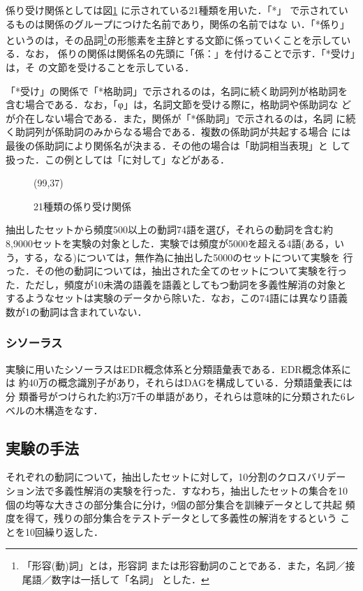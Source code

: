 \newpage
係り受け関係としては図\ref{fig:rels} に示されている21種類を用いた．「*」
で示されているものは関係のグループにつけた名前であり，関係の名前ではな
い．「*係り」というのは，その品詞\footnote{「形容(動)詞」とは，形容詞
または形容動詞のことである．また，名詞／接尾語／数字は一括して「名詞」
とした．}の形態素を主辞とする文節に係っていくことを示している．なお，
係りの関係は関係名の先頭に「係：」を付けることで示す．「*受け」は，そ
の文節を受けることを示している．

「*受け」の関係で「*格助詞」で示されるのは，名詞に続く助詞列が格助詞を
含む場合である．なお，「φ」は，名詞文節を受ける際に，格助詞や係助詞な
どが介在しない場合である．また，関係が「*係助詞」で示されるのは，名詞
に続く助詞列が係助詞のみからなる場合である．複数の係助詞が共起する場合
には最後の係助詞により関係名が決まる．その他の場合は「助詞相当表現」と
して扱った．この例としては「に対して」などがある．

\begin{figure}[htbp]
  \begin{center}
    \leavevmode
    \atari(99,37)
  \end{center}
  \caption{21種類の係り受け関係}
  \label{fig:rels}
\end{figure}

抽出したセットから頻度500以上の動詞74語を選び，それらの動詞を含む約
8,9000セットを実験の対象とした．実験では頻度が5000を超える4語(ある，い
う，する，なる)については，無作為に抽出した5000のセットについて実験を
行った．その他の動詞については，抽出された全てのセットについて実験を行っ
た．ただし，頻度が10未満の語義を語義としてもつ動詞を多義性解消の対象と
するようなセットは実験のデータから除いた．なお，この74語には異なり語義
数が1の動詞は含まれていない．

\subsubsection{シソーラス}

実験に用いたシソーラスはEDR概念体系と分類語彙表である．EDR概念体系には
約40万の概念識別子があり，それらはDAGを構成している．分類語彙表には分
類番号がつけられた約3万7千の単語があり，それらは意味的に分類された6レ
ベルの木構造をなす．

\subsection{実験の手法}
\label{sec:method}

それぞれの動詞について，抽出したセットに対して，10分割のクロスバリデー
ション法で多義性解消の実験を行った．すなわち，抽出したセットの集合を10
個の均等な大きさの部分集合に分け，9個の部分集合を訓練データとして共起
頻度を得て，残りの部分集合をテストデータとして多義性の解消をするという
ことを10回繰り返した．

